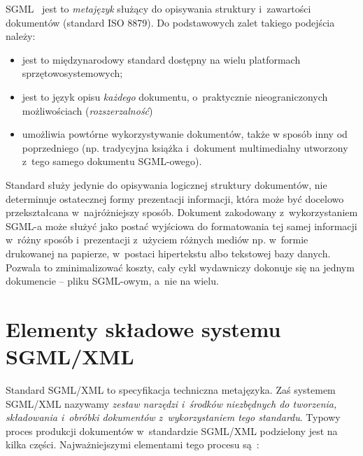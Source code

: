 \documentclass[skorowidz,brudnopis,xodstep]{xmgr}
\begin{document}
SGML~\cite{Goldfarb} jest to \emph{metajęzyk} służący do opisywania
struktury i~zawartości dokumentów (standard ISO 8879).  Do
podstawowych zalet takiego podejścia należy: 
\begin{itemize}
\item
jest to międzynarodowy
standard dostępny na wielu platformach sprzętowo{\dywiz}systemowych;
\item
jest to
język opisu \emph{każdego\/} dokumentu, o~praktycznie nieograniczonych
możliwościach (\emph{rozszerzalność\/}) 
\item
umożliwia powtórne
wykorzystywanie dokumentów, także w sposób inny od poprzedniego
(np. tradycyjna książka i~dokument multimedialny utworzony z~tego
samego dokumentu SGML-owego).
\end{itemize}

Standard służy jedynie do opisywania logicznej struktury dokumentów,
nie determinuje ostatecznej formy prezentacji informacji, która może
być docelowo przekształcana w~najróżniejszy sposób. Dokument
zakodowany z~wykorzystaniem SGML-a może służyć jako postać wyjściowa
do formatowania tej samej informacji w~różny sposób i~prezentacji
z~użyciem różnych mediów np. w~formie drukowanej na papierze,
w~postaci hipertekstu albo tekstowej bazy danych. Pozwala to
zminimalizować koszty, cały cykl wydawniczy dokonuje się
na jednym dokumencie -- pliku SGML-owym, a~nie na wielu.
    
\section{Elementy składowe systemu SGML/XML}

Standard SGML/XML to specyfikacja techniczna metajęzyka. Zaś systemem
SGML/XML nazywamy \emph{zestaw narzędzi i~środków niezbędnych do
tworzenia, składowania i~obróbki dokumentów z~wykorzystaniem tego
standardu}.  Typowy proces produkcji dokumentów w~standardzie SGML/XML
podzielony jest na kilka części. Najważniejszymi elementami tego
procesu są~\cite[s.~45--47]{maler.devel}:
    
\end{document}
